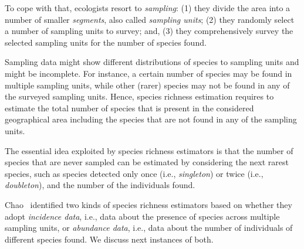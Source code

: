 \documentclass[sigconf,review,anonymous]{acmart}
\begin{document}
To cope with that, ecologists resort to \emph{sampling}:
(1) they divide the area into a number of smaller \emph{segments},
also called \emph{sampling units}; %
%
(2) they randomly select %
a number of sampling units to survey;
and, (3) they comprehensively survey the 
selected sampling units for the number of species
found.

Sampling data might show different distributions of species to sampling units
and might be incomplete.
%
For instance, a certain number of species may be found in multiple sampling units,
while other (rarer) species may not be found in any of the surveyed sampling units.
%
Hence, %
species richness estimation %
requires to estimate the total number of species that is present
in the considered geographical area including the species that are not found in
any of the sampling units.

The essential idea exploited by species richness estimators is that the number
of species that are never sampled %
can be estimated by considering the next rarest species, such as species
detected only once (i.e., \emph{singleton}) or twice (i.e., \emph{doubleton}), %
and the number of the individuals found. %
%

Chao~\cite{chao2016species} identified two kinds of species richness
estimators based on whether they adopt \emph{incidence data}, i.e., data about the
presence of species across multiple sampling units, or \emph{abundance data}, i.e., 
data about the number of individuals of different species found.
We discuss next instances of both.

%
\end{document}
